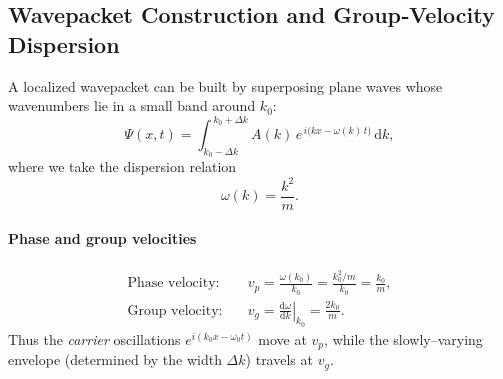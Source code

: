 \documentclass[a4paper,12pt]{report}
\begin{document}
\subsection*{Wavepacket Construction and Group‐Velocity Dispersion}

A localized wavepacket can be built by superposing plane waves whose wavenumbers lie in a small band around \(k_0\):
\[
\Psi(x,t) 
= \int_{k_0 - \Delta k}^{\,k_0 + \Delta k} 
A(k)\,e^{\,i\bigl(kx - \omega(k)\,t\bigr)}\,\mathrm{d}k,
\]
where we take the dispersion relation
\[
\omega(k) = \frac{k^2}{m}.
\]

\medskip

\paragraph{Phase and group velocities}
\begin{align*}
\text{Phase velocity:}\quad &v_p = \frac{\omega(k_0)}{k_0}
= \frac{k_0^2/m}{k_0} = \frac{k_0}{m},\\
\text{Group velocity:}\quad &v_g = \left.\frac{\mathrm{d}\omega}{\mathrm{d}k}\right|_{k_0}
= \frac{2k_0}{m}.
\end{align*}
Thus the \emph{carrier} oscillations \(e^{i(k_0 x - \omega_0 t)}\) move at \(v_p\), while the slowly–varying envelope (determined by the width \(\Delta k\)) travels at \(v_g\).

\medskip
\end{document}
